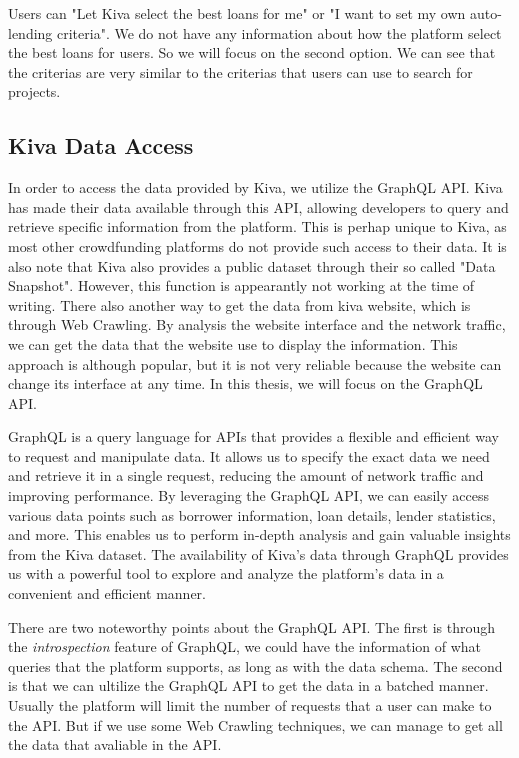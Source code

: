 Users can "Let Kiva select the best loans for me" or "I want to set my own auto-lending criteria".
We do not have any information about how the platform select the best loans for users.
So we will focus on the second option.
We can see that the criterias are very similar to the criterias that users can use to search for projects.

\subsection{Kiva Data Access}

In order to access the data provided by Kiva, we utilize the GraphQL API.
Kiva has made their data available through this API, allowing developers to query and retrieve specific information from the platform.
This is perhap unique to Kiva, as most other crowdfunding platforms do not provide such access to their data.
It is also note that Kiva also provides a public dataset through their so called "Data Snapshot".
However, this function is appearantly not working at the time of writing.
There also another way to get the data from kiva website, which is through Web Crawling.
By analysis the website interface and the network traffic, we can get the data that the website use to display the information.
This approach is although popular, but it is not very reliable because the website can change its interface at any time.
In this thesis, we will focus on the GraphQL API.

GraphQL is a query language for APIs that provides a flexible and efficient way to request and manipulate data.
It allows us to specify the exact data we need and retrieve it in a single request, reducing the amount of network traffic and improving performance.
By leveraging the GraphQL API, we can easily access various data points such as borrower information, loan details, lender statistics, and more.
This enables us to perform in-depth analysis and gain valuable insights from the Kiva dataset.
The availability of Kiva's data through GraphQL provides us with a powerful tool to explore and analyze the platform's data in a convenient and efficient manner.

There are two noteworthy points about the GraphQL API.
The first is through the \textit{introspection} \parencite{graphql-introspection} feature of GraphQL,
we could have the information of what queries that the platform supports,
as long as with the data schema.
The second is that we can ultilize the GraphQL API to get the data in a batched manner.
Usually the platform will limit the number of requests that a user can make to the API.
But if we use some Web Crawling techniques, we can manage to get all the data that avaliable in the API.

